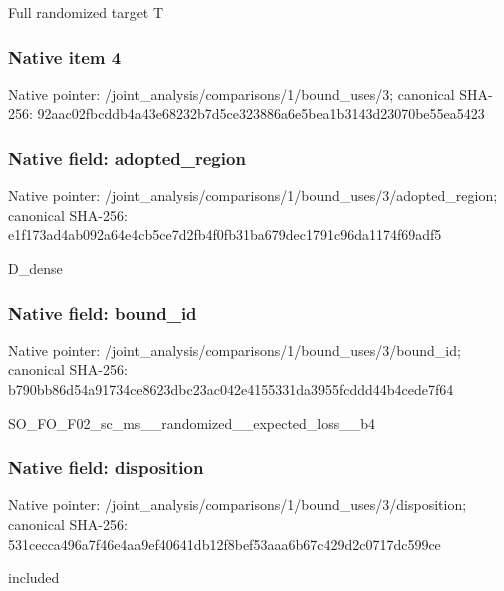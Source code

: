 \documentclass[10pt,a4paper]{article}
\begin{document}
\begingroup\raggedright\sloppy Full randomized target T\par\endgroup

\subsubsection{Native item 4}
Native pointer: /joint\_\allowbreak{}analysis/comparisons/1/bound\_\allowbreak{}uses/3; canonical SHA-256: 92aac02fbcddb4a43e68232b7d5ce323886a6e5bea1b3143d23070be55ea5423

\subsubsection{Native field: adopted\_\allowbreak{}region}
Native pointer: /joint\_\allowbreak{}analysis/comparisons/1/bound\_\allowbreak{}uses/3/adopted\_\allowbreak{}region; canonical SHA-256: e1f173ad4ab092a64e4cb5ce7d2fb4f0fb31ba679dec1791c96da1174f69adf5

\begingroup\raggedright\sloppy D\_\allowbreak{}dense\par\endgroup

\subsubsection{Native field: bound\_\allowbreak{}id}
Native pointer: /joint\_\allowbreak{}analysis/comparisons/1/bound\_\allowbreak{}uses/3/bound\_\allowbreak{}id; canonical SHA-256: b790bb86d54a91734ce8623dbc23ac042e4155331da3955fcddd44b4cede7f64

\begingroup\raggedright\sloppy SO\_\allowbreak{}FO\_\allowbreak{}F02\_\allowbreak{}sc\_\allowbreak{}ms\_\allowbreak{}\_\allowbreak{}randomized\_\allowbreak{}\_\allowbreak{}expected\_\allowbreak{}loss\_\allowbreak{}\_\allowbreak{}b4\par\endgroup

\subsubsection{Native field: disposition}
Native pointer: /joint\_\allowbreak{}analysis/comparisons/1/bound\_\allowbreak{}uses/3/disposition; canonical SHA-256: 531cecca496a7f46e4aa9ef40641db12f8bef53aaa6b67c429d2c0717dc599ce

\begingroup\raggedright\sloppy included\par\endgroup
\end{document}
